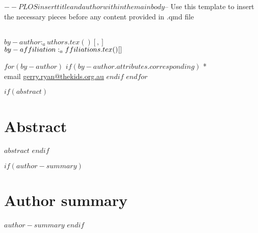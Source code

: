 $-- PLOS insert title and author within the main body
$-- Use this template to insert the necessary pieces before any content provided in .qmd file
\vspace*{0.2in}

\begin{flushleft}
{\Large
\textbf{} %
}
\newline
\\
$by-author:_authors.tex()[, ]$
\\
\bigskip
$by-affiliation:_affiliations.tex()[\\ ]$
\bigskip

%
%





$for(by-author)$
$if(by-author.attributes.corresponding)$
* \\ email \href{mailto:gerry.ryan@thekids.org.au}{gerry.ryan@thekids.org.au}
$endif$
$endfor$

\end{flushleft}

$if(abstract)$
\section*{Abstract}
$abstract$
$endif$

$if(author-summary)$
\section*{Author summary}
$author-summary$
$endif$

\linenumbers
